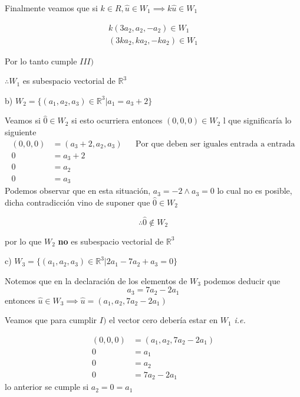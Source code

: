 \documentclass[letterpaper]{article}
\newcommand{\R}{\mathds{R}}
\renewcommand{\*}{\cdot}
\theoremstyle{definition}
\begin{document}
 Finalmente veamos que si $ k \in R, \hat{u} \in W_1 \implies k\hat{u} \in W_1$
 
	\begin{align*}
		k(3a_2, a_2, -a_2) \in W_1\\
		(3ka_2, ka_2, -ka_2) \in W_1
	\end{align*}
	
	Por lo tanto cumple $ III) $ 
	
	\begin{center}
		$ \therefore W_1  $ es subespacio vectorial de $ \R^3 $
	\end{center}


b) $W_{2} = \lbrace (a_{1},a_{2},a_{3}) \in \mathbb{R}^{3} \big\vert  a_{1} = a_{3} + 2 \rbrace$

Veamos si $ \hat{0} \in W_2 $ si esto ocurriera entonces $ (0,0,0)  \in W_2$ l que significaría lo siguiente
\begin{align*}
	(0,0,0) &= (a_3 + 2, a_2, a_3) && \text{Por que deben ser iguales entrada a entrada}\\
	0 &= a_3 + 2\\
	0 &= a_2 \\
	0 &= a_3 
\end{align*}
Podemos observar que en esta situación, $ a_3 = -2 \land a_3 = 0 $ lo cual no es posible, dicha contradicción vino de suponer que $ \hat{0} \in W_2 $

\[ \therefore \hat{0} \notin W_2  \] 
\begin{center}
	por lo que $ W_2 $ \textbf{no} es subespacio vectorial de $ \R^3 $
\end{center}


\noindent c) $W_{3} = \lbrace (a_{1},a_{2},a_{3}) \in \mathbb{R}^{3} \big\vert  2a_{1} - 7a_{2} + a_{3} = 0 \rbrace$

Notemos que en la declaración de los elementos de $ W_3 $ podemos deducir que \[ a_3 = 7a_2 - 2 a_1 \] entonces $ \hat{u} \in W_3 \implies \hat{u} = (a_1, a_2, 7a_2 - 2a_1)  $

Veamos que para cumplir $ I) $ el vector cero debería estar en $ W_1 $ \textit{i.e.} 

\begin{align*}
	(0,0,0) &= (a_1, a_2, 7a_2 - 2 a_1) \\
	0 &=  a_1\\
	0 &=  a_2\\
	0 &=  7a_2 -2 a_1
\end{align*}
 lo anterior se cumple si $ a_2 = 0 = a_1 $
 
\end{document}

